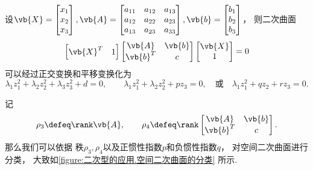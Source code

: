 \begin{theorem}[空间二次曲面的分类定理]
设\(\vb{X} = \begin{bmatrix}
	x_1 \\ x_2 \\ x_3
\end{bmatrix},
\vb{A} = \begin{bmatrix}
	a_{11} & a_{12} & a_{13} \\
	a_{12} & a_{22} & a_{23} \\
	a_{13} & a_{23} & a_{33}
\end{bmatrix},
\vb{b} = \begin{bmatrix}
	b_1 \\ b_2 \\ b_3
\end{bmatrix}\)，
则二次曲面\[
	\begin{bmatrix}
		\vb{X}^T & 1
	\end{bmatrix}
	\begin{bmatrix}
		\vb{A} & \vb{b} \\
		\vb{b}^T & c
	\end{bmatrix}
	\begin{bmatrix}
		\vb{X} \\ 1
	\end{bmatrix}
	= 0
\]可以经过正交变换和平移变换化为\[
	\lambda_1 z_1^2 + \lambda_2 z_2^2 + \lambda_3 z_3^2 + d = 0,
	\qquad
	\lambda_1 z_1^2 + \lambda_2 z_2^2 + p z_3 = 0,
	\quad\text{或}\quad
	\lambda_1 z_1^2 + q z_2 + r z_3 = 0.
\]
\end{theorem}

记\[
	\rho_3 \defeq \rank\vb{A},
	\qquad
	\rho_4 \defeq \rank\begin{bmatrix}
		\vb{A} & \vb{b} \\
		\vb{b}^T & c
	\end{bmatrix}.
\]
那么我们可以依据
秩\(\rho_3,\rho_4\)以及正惯性指数\(p\)和负惯性指数\(q\)，
对空间二次曲面进行分类，
大致如\cref{figure:二次型的应用.空间二次曲面的分类} 所示.

